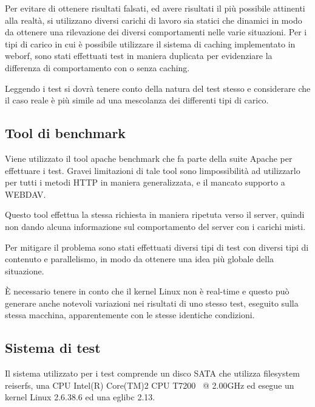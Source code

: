 \documentclass[a4paper,11pt]{article}
\begin{document}
\bigskip

{\sffamily
Per evitare di ottenere risultati falsati, ed avere risultati il pi\`u
possibile attinenti alla realt\`a, si utilizzano diversi carichi di
lavoro sia statici che dinamici in modo da ottenere una rilevazione dei
diversi comportamenti nelle varie situazioni. Per i tipi di carico in
cui \`e possibile utilizzare il sistema di caching implementato in
weborf, sono stati effettuati test in maniera duplicata per evidenziare
la differenza di comportamento con o senza caching.}


\bigskip

{\sffamily
Leggendo i test si dovr\`a tenere conto della natura del test stesso e
considerare che il caso reale \`e pi\`u simile ad una mescolanza dei
differenti tipi di carico.}


\bigskip

\subsection{Tool di benchmark}
{\sffamily
Viene utilizzato il tool apache benchmark che fa parte della suite
Apache per effettuare i test. Gravei limitazioni di tale tool sono
l{\textquotesingle}impossibilit\`a ad utilizzarlo per tutti i metodi
HTTP in maniera generalizzata, e il mancato supporto a WEBDAV.}

{\sffamily
Questo tool effettua la stessa richiesta in maniera ripetuta verso il
server, quindi non dando alcuna informazione sul comportamento del
server con i carichi misti.}

{\sffamily
Per mitigare il problema sono stati effettuati diversi tipi di test con
diversi tipi di contenuto e parallelismo, in modo da ottenere una idea
pi\`u globale della situazione.}

{\sffamily
\`E necessario tenere in conto che il kernel Linux non \`e real-time e
questo pu\`o generare anche notevoli variazioni nei risultati di uno
stesso test, eseguito sulla stessa macchina, apparentemente con le
stesse identiche condizioni.}


\bigskip

\subsection[Sistema di test]{Sistema di test}
{\sffamily
Il sistema utilizzato per i test comprende un disco SATA che utilizza
filesystem reiserfs, una CPU Intel(R) Core(TM)2 CPU T7200 \ @ 2.00GHz
ed esegue un kernel Linux 2.6.38.6 ed una eglibc 2.13.}
\end{document}
